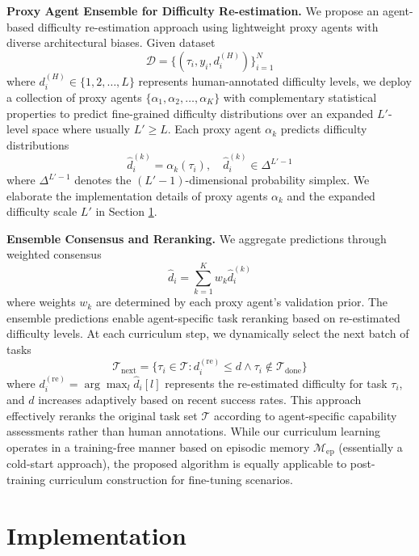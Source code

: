 \documentclass{article} %
\begin{document}
\textbf{Proxy Agent Ensemble for Difficulty Re-estimation.} We propose an agent-based difficulty re-estimation approach using lightweight proxy agents with diverse architectural biases. Given dataset 
$$\mathcal{D} = \{(\tau_i, y_i, d_i^{(H)})\}_{i=1}^N$$ 
where $d_i^{(H)} \in \{1, 2, \ldots, L\}$ represents human-annotated difficulty levels, we deploy a collection of proxy agents $\{\alpha_1, \alpha_2, \ldots, \alpha_K\}$ with complementary statistical properties to predict fine-grained difficulty distributions over an expanded $L'$-level space where usually $L' \ge L$. Each proxy agent $\alpha_k$ predicts difficulty distributions
\begin{equation}
\hat{d}_i^{(k)} = \alpha_k(\tau_i), \quad \hat{d}_i^{(k)} \in \Delta^{L'-1}
\end{equation}
where $\Delta^{L'-1}$ denotes the $(L'-1)$-dimensional probability simplex. We elaborate the implementation details of proxy agents $\alpha_k$ and the expanded difficulty scale $L'$ in Section \ref{implementation}.

\textbf{Ensemble Consensus and Reranking.} We aggregate predictions through weighted consensus
\begin{equation}
\hat{d}_i = \sum_{k=1}^K w_k \hat{d}_i^{(k)}
\end{equation}
where weights $w_k$ are determined by each proxy agent's validation prior. The ensemble predictions enable agent-specific task reranking based on re-estimated difficulty levels. At each curriculum step, we dynamically select the next batch of tasks
\begin{equation}
\mathcal{T}_{\text{next}} = \{\tau_i \in \mathcal{T} : d_i^{(\text{re})} \leq d \land \tau_i \notin \mathcal{T}_{\text{done}}\}
\end{equation}
where $d_i^{(\text{re})} = \arg\max_l \hat{d}_i[l]$ represents the re-estimated difficulty for task $\tau_i$, and $d$ increases adaptively based on recent success rates. This approach effectively reranks the original task set $\mathcal{T}$ according to agent-specific capability assessments rather than human annotations. While our curriculum learning operates in a training-free manner based on episodic memory $\mathcal{M}_{\text{ep}}$ (essentially a cold-start approach), the proposed algorithm is equally applicable to post-training curriculum construction for fine-tuning scenarios.


\section{Implementation}
\label{implementation}
\end{document}
